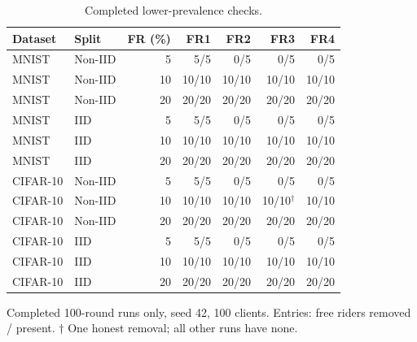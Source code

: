\begin{table}[t]\centering\footnotesize\setlength{\tabcolsep}{3pt}
\caption{Completed lower-prevalence checks.}\label{tab:low-share}
\begin{tabular}{llrrrrr}\toprule
Dataset & Split & FR (\%) & FR1 & FR2 & FR3 & FR4 \\ \midrule
MNIST & Non-IID & 5 & 5/5 & 0/5 & 0/5 & 0/5 \\
MNIST & Non-IID & 10 & 10/10 & 10/10 & 10/10 & 10/10 \\
MNIST & Non-IID & 20 & 20/20 & 20/20 & 20/20 & 20/20 \\
\midrule
MNIST & IID & 5 & 5/5 & 0/5 & 0/5 & 0/5 \\
MNIST & IID & 10 & 10/10 & 10/10 & 10/10 & 10/10 \\
MNIST & IID & 20 & 20/20 & 20/20 & 20/20 & 20/20 \\
\midrule
CIFAR-10 & Non-IID & 5 & 5/5 & 0/5 & 0/5 & 0/5 \\
CIFAR-10 & Non-IID & 10 & 10/10 & 10/10 & 10/10$^{\dagger}$ & 10/10 \\
CIFAR-10 & Non-IID & 20 & 20/20 & 20/20 & 20/20 & 20/20 \\
\midrule
CIFAR-10 & IID & 5 & 5/5 & 0/5 & 0/5 & 0/5 \\
CIFAR-10 & IID & 10 & 10/10 & 10/10 & 10/10 & 10/10 \\
CIFAR-10 & IID & 20 & 20/20 & 20/20 & 20/20 & 20/20 \\
\bottomrule
\end{tabular}
\par\smallskip\parbox{\columnwidth}{\scriptsize Completed 100-round runs only, seed 42, 100 clients. Entries: free riders removed / present. $\dagger$ One honest removal; all other runs have none.}
\end{table}
